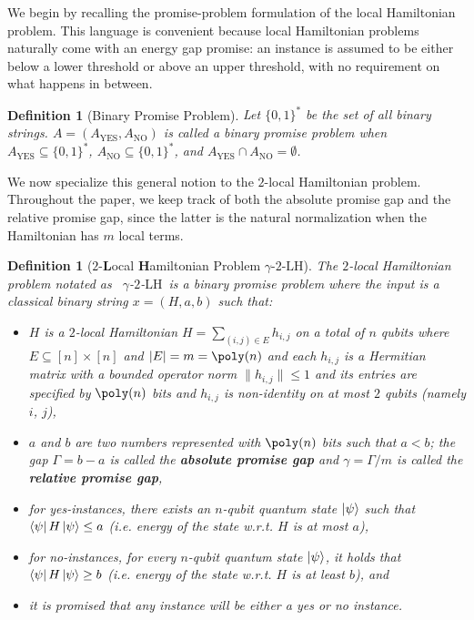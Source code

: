 \documentclass[a4paper,onecolumn,11pt]{quantumarticle}
\theoremstyle{plain}
\newtheorem{definition}[theorem]{Definition}
\newcommand{\kLH}{$\gamma$-$2$-$\mathrm{LH}$}
\begin{document}
We begin by recalling the promise-problem formulation of the local Hamiltonian problem.  This language is convenient because local Hamiltonian problems naturally come with an energy gap promise: an instance is assumed to be either below a lower threshold or above an upper threshold, with no requirement on what happens in between.

\begin{definition}[Binary Promise Problem]
Let $\{0, 1\}^*$ be the set of all binary strings. $A = \left(A_{\mathrm{YES}}, A_{\mathrm{NO}}\right)$ is called a binary promise problem when $A_{\mathrm{YES}} \subseteq \{0, 1\}^*$, $A_{\mathrm{NO}} \subseteq \{0, 1\}^*$, and $A_{\mathrm{YES}} \cap A_{\mathrm{NO}} = \emptyset$.
\end{definition}

We now specialize this general notion to the $2$-local Hamiltonian problem.  Throughout the paper, we keep track of both the absolute promise gap and the relative promise gap, since the latter is the natural normalization when the Hamiltonian has $m$ local terms.

\begin{definition}[$2$-\textbf{L}ocal \textbf{H}amiltonian Problem \kLH]
\label{defn:k-LH}
The $2$-local Hamiltonian problem notated as \ \kLH\ is a binary promise problem where the input is a classical binary string $x = (H, a, b)$ such that:
\begin{itemize}
    \item $H$ is a $2$-local Hamiltonian $H = \sum\limits_{(i, j) \in E} h_{i, j}$ on a total of $n$ qubits where $E \subseteq [n] \times [n]$ and $|E| = m = \poly(n)$ and each $h_{i,j}$ is a Hermitian matrix with a bounded operator norm $\|h_{i,j}\| \leq 1$ and its entries are specified by $\poly(n)$ bits and $h_{i,j}$ is non-identity on at most $2$ qubits (namely $i$, $j$),
    \item $a$ and $b$ are two numbers represented with $\poly(n)$ bits such that $a < b$; the gap $\Gamma = b - a$ is called the \textbf{absolute promise gap} and $\gamma = \Gamma / m$ is called the \textbf{relative promise gap},
    \item for yes-instances, there exists an $n$-qubit quantum state $\ket{\psi}$ such that $\bra{\psi}H\ket{\psi} \leq a$ (i.e. energy of the state w.r.t. $H$ is at most $a$),
    \item for no-instances, for every $n$-qubit quantum state $\ket{\psi}$, it holds that $\bra{\psi}H\ket{\psi} \geq b$ (i.e. energy of the state w.r.t. $H$ is at least $b$), and
    \item it is promised that any instance will be either a yes or no instance.
\end{itemize}
\end{definition}
\end{document}
